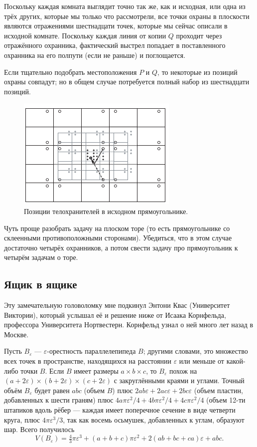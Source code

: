 Поскольку каждая комната выглядит точно так же, как и исходная, или одна из трёх других, которые мы только что рассмотрели, все точки охраны в плоскости являются отражениями шестнадцати точек, которые мы сейчас описали в исходной комнате.
Поскольку каждая линия от копии $Q$ проходит через отражённого охранника, фактический выстрел попадает в поставленного охранника на его полпути (если не раньше) и поглощается.

Если тщательно подобрать местоположения $P$ и $Q$, то некоторые из позиций охраны совпадут;
но в общем случае потребуется полный набор из шестнадцати позиций.

\begin{figure}[h!]
\centering
\includegraphics[scale=1]{pics/room3}
\caption{Позиции телохранителей в исходном прямоугольнике.}
\label{pic:room3}
\end{figure}

\begin{addedbytheeditors}
Чуть проще разобрать задачу на плоском торе (то есть прямоугольнике со склеенными противоположными сторонами).
Убедиться, что в этом случае достаточно четырёх охранников, а потом свести задачу про прямоугольник к четырём задачам о торе.
\end{addedbytheeditors}



\subsection*{Ящик в ящике}

Эту замечательную головоломку мне подкинул Энтони Квас (Университет Виктории), который услышал её и решение ниже от Исаака Корнфельда, профессора Университета Нортвестерн.
Корнфельд узнал о ней много лет назад в Москве.

Пусть $B_\varepsilon$ --- $\varepsilon$-орестность параллелепипеда $B$;
другими словами, это множество всех точек в пространстве, находящихся на расстоянии $\varepsilon$ или меньше от какой-либо точки $B$.
Если $B$ имеет размеры $a \times b \times c$, то $B_\varepsilon$ похож на $(a + 2\varepsilon) \times (b + 2\varepsilon) \times (c + 2\varepsilon)$ с закруглёнными краями и углами.
Точный объём $B_\varepsilon$ будет равен $abc$ (объем $B$) плюс $2ab\varepsilon + 2ac\varepsilon + 2bc\varepsilon$ (объем пластин, добавленных к шести граням) плюс $4a\pi\varepsilon^2 /4 + 4b\pi\varepsilon^2 /4 + 4c\pi\varepsilon^2 /4$ (объем 12-ти штапиков вдоль рёбер --- каждая имеет поперечное сечение в виде четверти круга, плюс $4\pi\varepsilon^3 /3$, так как восемь осьмушек, добавленных к углам, образуют шар.
Всего получилось
\[V(B_\varepsilon)=\tfrac43\pi\varepsilon^3+(a+b+c)\pi\varepsilon^2+2(ab+bc+ca)\varepsilon+abc.\]

